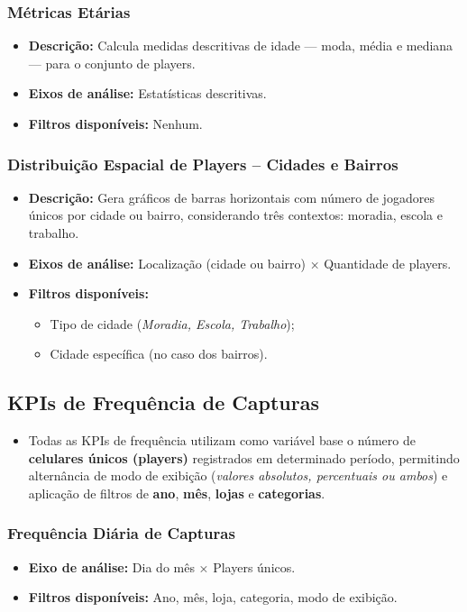 \documentclass[12pt]{article}
\begin{document}
\subsubsection{Métricas Etárias}
\begin{itemize}
    \item \textbf{Descrição:} Calcula medidas descritivas de idade — moda, média e mediana — para o conjunto de players.
    \item \textbf{Eixos de análise:} Estatísticas descritivas.
    \item \textbf{Filtros disponíveis:} Nenhum.
\end{itemize}

\subsubsection{Distribuição Espacial de Players – Cidades e Bairros}
\begin{itemize}
    \item \textbf{Descrição:} Gera gráficos de barras horizontais com número de jogadores únicos por cidade ou bairro, considerando três contextos: moradia, escola e trabalho.
    \item \textbf{Eixos de análise:} Localização (cidade ou bairro) × Quantidade de players.
    \item \textbf{Filtros disponíveis:} 
    \begin{itemize}
        \item Tipo de cidade (\textit{Moradia, Escola, Trabalho});
        \item Cidade específica (no caso dos bairros).
    \end{itemize}
\end{itemize}

\subsection{KPIs de Frequência de Capturas}
\begin{itemize}
    \item Todas as KPIs de frequência utilizam como variável base o número de \textbf{celulares únicos (players)} registrados em determinado período, permitindo alternância de modo de exibição (\textit{valores absolutos, percentuais ou ambos}) e aplicação de filtros de \textbf{ano}, \textbf{mês}, \textbf{lojas} e \textbf{categorias}.
\end{itemize}

\subsubsection{Frequência Diária de Capturas}
\begin{itemize}
    \item \textbf{Eixo de análise:} Dia do mês × Players únicos.
    \item \textbf{Filtros disponíveis:} Ano, mês, loja, categoria, modo de exibição.
\end{itemize}
\end{document}
